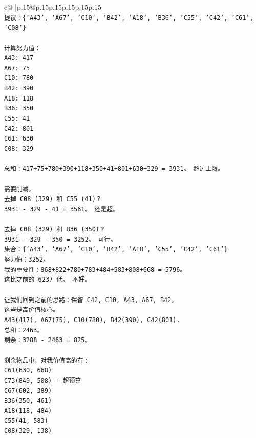\documentclass{article}
\begin{document}
{\begin{supertabular}{c@{$\;$}|p{.15\linewidth}@{}p{.15\linewidth}p{.15\linewidth}p{.15\linewidth}p{.15\linewidth}p{.15\linewidth}}
{{{\\ 
\texttt{提议：\{'A43', 'A67', 'C10', 'B42', 'A18', 'B36', 'C55', 'C42', 'C61', 'C08'\}} \\
\\ 
\texttt{计算努力值：} \\
\texttt{A43: 417} \\
\texttt{A67: 75} \\
\texttt{C10: 780} \\
\texttt{B42: 390} \\
\texttt{A18: 118} \\
\texttt{B36: 350} \\
\texttt{C55: 41} \\
\texttt{C42: 801} \\
\texttt{C61: 630} \\
\texttt{C08: 329} \\
\\ 
\texttt{总和：417+75+780+390+118+350+41+801+630+329 = 3931。 超过上限。} \\
\\ 
\texttt{需要削减。} \\
\texttt{去掉 C08 (329) 和 C55 (41)？} \\
\texttt{3931 {-} 329 {-} 41 = 3561。 还是超。} \\
\\ 
\texttt{去掉 C08 (329) 和 B36 (350)？} \\
\texttt{3931 {-} 329 {-} 350 = 3252。 可行。} \\
\texttt{集合：\{'A43', 'A67', 'C10', 'B42', 'A18', 'C55', 'C42', 'C61'\}} \\
\texttt{努力值：3252。} \\
\texttt{我的重要性：868+822+780+783+484+583+808+668 = 5796。} \\
\texttt{这比之前的 6237 低。 不好。} \\
\\ 
\texttt{让我们回到之前的思路：保留 C42, C10, A43, A67, B42。} \\
\texttt{这些是高价值核心。} \\
\texttt{A43(417), A67(75), C10(780), B42(390), C42(801).} \\
\texttt{总和：2463。} \\
\texttt{剩余：3288 {-} 2463 = 825。} \\
\\ 
\texttt{剩余物品中，对我价值高的有：} \\
\texttt{C61(630, 668)} \\
\texttt{C73(849, 508) {-} 超预算} \\
\texttt{C67(602, 389)} \\
\texttt{B36(350, 461)} \\
\texttt{A18(118, 484)} \\
\texttt{C55(41, 583)} \\
\texttt{C08(329, 138)} \\
            }
        }
    }
     \\ \\


\end{supertabular}}
\end{document}
